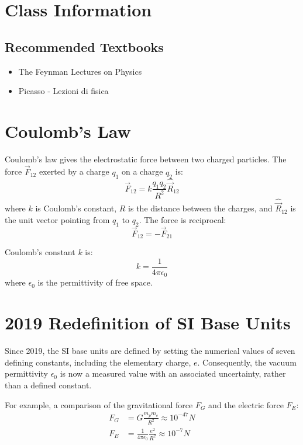 \section*{Class Information}

\subsection*{Recommended Textbooks}
\begin{itemize}
    \item The Feynman Lectures on Physics
    \item Picasso - Lezioni di fisica
\end{itemize}

\section{Coulomb's Law}

Coulomb's law gives the electrostatic force between two charged particles. The force \(\vec{F}_{12}\) exerted by a charge \(q_1\) on a charge \(q_2\) is:
\begin{equation}
    \vec{F}_{12} = k \frac{q_1 q_2}{R^2} \hat{\vec{R}}_{12}
\end{equation}
where \(k\) is Coulomb's constant, \(R\) is the distance between the charges, and \(\hat{\vec{R}}_{12}\) is the unit vector pointing from \(q_1\) to \(q_2\). The force is reciprocal:
\begin{equation}
    \vec{F}_{12} = -\vec{F}_{21}
\end{equation}

Coulomb's constant \(k\) is:
\begin{equation}
    k = \frac{1}{4\pi\epsilon_0}
\end{equation}
where \(\epsilon_0\) is the permittivity of free space.

\section{2019 Redefinition of SI Base Units}

Since 2019, the SI base units are defined by setting the numerical values of seven defining constants, including the elementary charge, \(e\). Consequently, the vacuum permittivity \(\epsilon_0\) is now a measured value with an associated uncertainty, rather than a defined constant.

For example, a comparison of the gravitational force \(F_G\) and the electric force \(F_E\):
\begin{align}
    F_G &= G \frac{m_p m_e}{R^2} \approx 10^{-47} N \\
    F_E &= \frac{1}{4\pi\epsilon_0} \frac{e^2}{R^2} \approx 10^{-7} N
\end{align}